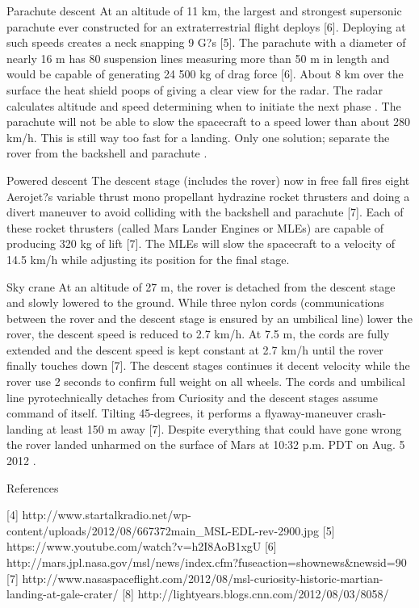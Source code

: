 Parachute descent
At an altitude of 11 km, the largest and strongest supersonic parachute ever constructed for an extraterrestrial flight deploys \cite{NASALanding} [6]. Deploying at such speeds creates a neck snapping 9 G?s [5]. The parachute with a diameter of nearly 16 m has 80 suspension lines measuring more than 50 m in length and would be capable of generating 24 500 kg of drag force [6]. About 8 km over the surface the heat shield poops of giving a clear view for the radar. The radar calculates altitude and speed determining when to initiate the next phase \cite{NASALanding}.
The parachute will not be able to slow the spacecraft to a speed lower than about 280 km/h. This is still way too fast for a landing. Only one solution; separate the rover from the backshell and parachute \cite{NASALanding}.

Powered descent
The descent stage (includes the rover) now in free fall fires eight Aerojet?s variable thrust mono propellant hydrazine rocket thrusters and doing a divert maneuver to avoid colliding with the backshell and parachute \cite{NASALanding} [7]. Each of these rocket thrusters (called Mars Lander Engines or MLEs) are capable of producing 320 kg of lift [7]. The MLEs will slow the spacecraft to a velocity of 14.5 km/h while adjusting its position for the final stage. 

Sky crane
At an altitude of 27 m, the rover is detached from the descent stage and slowly lowered to the ground. While three nylon cords (communications between the rover and the descent stage is ensured by an umbilical line) lower the rover, the descent speed is reduced to 2.7 km/h. At 7.5 m, the cords are fully extended and the descent speed is kept constant at 2.7 km/h until the rover finally touches down \cite{NASALanding} [7]. The descent stages continues it decent velocity while the rover use 2 seconds to confirm full weight on all wheels. The cords and umbilical line pyrotechnically detaches from Curiosity and the descent stages assume command of itself. Tilting 45-degrees, it performs a flyaway-maneuver crash-landing at least 150 m away [7]. 
Despite everything that could have gone wrong the rover landed unharmed on the surface of Mars at 10:32 p.m. PDT on Aug. 5 2012 \cite{NASALanding}.


References


[4]	http://www.startalkradio.net/wp-content/uploads/2012/08/667372main\_MSL-EDL-rev-2900.jpg
[5]	https://www.youtube.com/watch?v=h2I8AoB1xgU
[6]	http://mars.jpl.nasa.gov/msl/news/index.cfm?fuseaction=shownews\&newsid=90
[7]	http://www.nasaspaceflight.com/2012/08/msl-curiosity-historic-martian-landing-at-gale-crater/
[8]	http://lightyears.blogs.cnn.com/2012/08/03/8058/